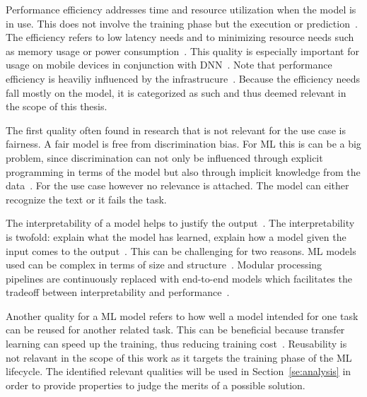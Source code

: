 Performance efficiency addresses time and resource utilization when the model is in use.
This does not involve the training phase but the execution or
prediction~\citep{siebert_construction_2021}.
The efficiency refers to low latency needs and to minimizing resource needs such as memory
usage or power consumption~\citep{nakamichi_requirements-driven_2020, siebert_construction_2021,
sourvanos_challenges_2018}.
This quality is especially important for usage on mobile devices in conjunction with
\ac{DNN}~\citep{sourvanos_challenges_2018, niu_26ms_2019}.
Note that performance efficiency is heaviliy influenced by the
infrastrucure~\citep{nakamichi_requirements-driven_2020, siebert_construction_2021}.
Because the efficiency needs fall mostly on the model, it is categorized as such and thus deemed
relevant in the scope of this thesis.

The first quality often found in research that is not relevant for the use case is fairness.
A fair model is free from discrimination bias.
For \ac{ML} this is can be a big problem, since discrimination can not only be influenced through
explicit programming in terms of the model but also through implicit knowledge from the
data~\citep{vogelsang_requirements_2019}.
For the use case however no relevance is attached.
The model can either recognize the text or it fails the task.

The interpretability of a model helps to justify the output~\citep{ashmore_assuring_2021}.
The interpretability is twofold: explain what the model has learned, explain how a model given the
input comes to the output~\citep{vogelsang_requirements_2019}.
This can be challenging for two reasons.
\ac{ML} models used can be complex in terms of size and structure~\citep{ashmore_assuring_2021}.
Modular processing pipelines are continuously replaced with end-to-end
models which facilitates the tradeoff between interpretability and
performance~\cite{arpteg_software_2018}.

Another quality for a \ac{ML} model refers to how well a model intended for one task can be reused
for another related task.
This can be beneficial because transfer learning can speed up the training, thus reducing training
cost~\citep{ashmore_assuring_2021}.
Reusability is not relavant in the scope of this work as it targets the training phase of the
\ac{ML} lifecycle.
The identified relevant qualities will be used in Section~\ref{se:analysis} in order to provide
properties to judge the merits of a possible solution.
